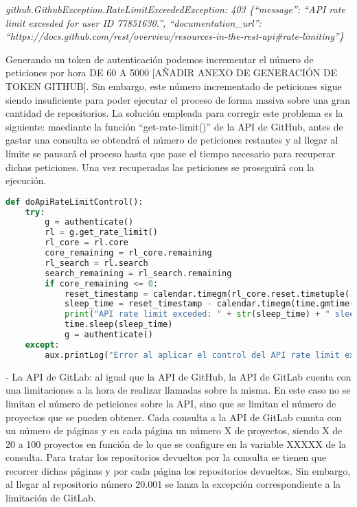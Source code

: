 \textit{github.GithubException.RateLimitExceededException: 403 \{``message'': ``API rate limit exceeded for user ID 77851630.'', ``documentation\_url'': ``https://docs.github.com/rest/overview/resources-in-the-rest-api\#rate-limiting''\}}

Generando un token de autenticación podemos incrementar el número de peticiones por hora DE 60 A 5000 [AÑADIR ANEXO DE GENERACIÓN DE TOKEN GITHUB]. Sin embargo, este número incrementado de peticiones sigue siendo insuficiente para poder ejecutar el proceso de forma masiva sobre una gran cantidad de repositorios.
La solución empleada para corregir este problema es la siguiente: maediante la función ``get-rate-limit()'' de la API de GitHub, antes de gastar una consulta se obtendrá el número de peticiones restantes y al llegar al límite se pausará el proceso hasta que pase el tiempo necesario para recuperar dichas peticiones. Una vez recuperadas las peticiones se proseguirá con la ejecución.

\begin{lstlisting}[language=Python, caption=Control del nº de peticiones a la API GitHub, label={lst:ejem1}]
def doApiRateLimitControl():
    try:
        g = authenticate()
        rl = g.get_rate_limit()
        rl_core = rl.core
        core_remaining = rl_core.remaining
        rl_search = rl.search
        search_remaining = rl_search.remaining
        if core_remaining <= 0:
            reset_timestamp = calendar.timegm(rl_core.reset.timetuple())
            sleep_time = reset_timestamp - calendar.timegm(time.gmtime()) + 5
            print("API rate limit exceded: " + str(sleep_time) + " sleep_time. Waiting...")
            time.sleep(sleep_time)
            g = authenticate()
    except:
        aux.printLog("Error al aplicar el control del API rate limit exceded...", logging.ERROR)
\end{lstlisting}

- La API de GitLab: al igual que la API de GitHub, la API de GitLab cuenta con una limitaciones a la hora de realizar llamadas sobre la misma. En este caso no se limitan el número de peticiones sobre la API, sino que se limitan el número de proyectos que se pueden obtener.
Cada consulta a la API de GitLab cuanta con un número de páginas y en cada página un número X de proyectos, siendo X de 20 a 100 proyectos en función de lo que se configure en la variable XXXXX de la consulta. Para tratar los repositorios devueltos por la consulta se tienen que recorrer dichas páginas y por cada página los repositorios devueltos. Sin embargo, al llegar al repositorio número 20.001 se lanza la excepción correspondiente a la limitación de GitLab.

